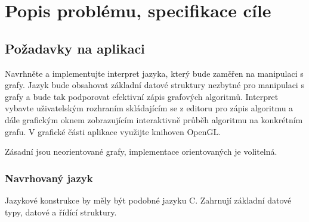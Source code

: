 \documentclass[11pt,twoside,a4paper]{book}
\begin{document}

\chapter{Popis problému, specifikace cíle}



\section{Požadavky na aplikaci}

Navrhněte a implementujte interpret jazyka, který bude zaměřen na manipulaci s grafy. Jazyk bude obsahovat základní datové struktury nezbytné pro manipulaci s grafy a bude tak podporovat efektivní zápis grafových algoritmů. Interpret vybavte uživatelským rozhraním skládajícím se z editoru pro zápis algoritmu a dále grafickým oknem zobrazujícím interaktivně průběh algoritmu na konkrétním grafu. V grafické části aplikace využijte knihoven OpenGL.

Zásadní jsou neorientované grafy, implementace orientovaných je volitelná.

\subsection{Navrhovaný jazyk}

Jazykové konstrukce by měly být podobné jazyku C. Zahrnují základní datové typy, datové a řídící struktury.
\end{document}
